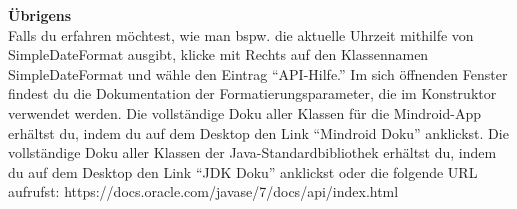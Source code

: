 	\textbf{Übrigens}\\
		
	Falls du erfahren möchtest, wie man bspw. die aktuelle Uhrzeit mithilfe von SimpleDateFormat ausgibt, klicke mit Rechts auf den Klassennamen SimpleDateFormat und wähle den Eintrag “API-Hilfe.” Im sich öffnenden Fenster findest du die Dokumentation der Formatierungsparameter, die im Konstruktor verwendet werden.
	Die vollständige Doku aller Klassen für die Mindroid-App erhältst du, indem du auf dem Desktop den Link “Mindroid Doku” anklickst.
	Die vollständige Doku aller Klassen der Java-Standardbibliothek erhältst du, indem du auf dem Desktop den Link “JDK Doku” anklickst oder die folgende URL aufrufst: https://docs.oracle.com/javase/7/docs/api/index.html 
	